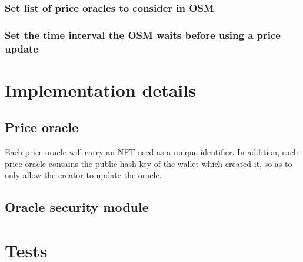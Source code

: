 \documentclass{article} %
\begin{document}
\subsubsection{Set list of price oracles to consider in OSM}

\subsubsection{Set the time interval the OSM waits before using a price update}


\section{Implementation details}


\subsection{Price oracle}

Each price oracle will carry an NFT used as a unique identifier.
In addition, each price oracle contains the public hash key of the wallet which
created it, so as to only allow the creator to update the oracle.

\subsection{Oracle security module}

\section{Tests}


% 
\end{document}
